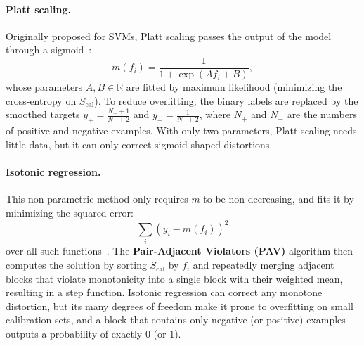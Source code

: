 \documentclass[a4paper, 10pt]{article}
\begin{document}
\paragraph{Platt scaling.}
Originally proposed for SVMs, Platt scaling passes the output of the model through a sigmoid~\cite{niculescu2005predicting}:
\begin{equation}\label{eq:platt}
    m(f_i) = \frac{1}{1 + \exp(A f_i + B)},
\end{equation}
whose parameters $A, B \in \mathbb{R}$ are fitted by maximum likelihood (minimizing the cross-entropy on $S_{\mathrm{cal}}$). To reduce overfitting, the binary labels are replaced by the smoothed targets $y_+ = \frac{N_+ + 1}{N_+ + 2}$ and $y_- = \frac{1}{N_- + 2}$, where $N_+$ and $N_-$ are the numbers of positive and negative examples. With only two parameters, Platt scaling needs little data, but it can only correct sigmoid-shaped distortions.
 
\paragraph{Isotonic regression.}
This non-parametric method only requires $m$ to be non-decreasing, and fits it by minimizing the squared error:
\begin{equation}
  \sum_i (y_i - m(f_i))^2
\end{equation}
over all such functions~\cite{niculescu2005predicting}. The \textbf{Pair-Adjacent Violators (PAV)} algorithm then computes the solution by sorting $S_{\mathrm{cal}}$ by $f_i$ and repeatedly merging adjacent blocks that violate monotonicity into a single block with their weighted mean, resulting in a step function. Isotonic regression can correct any monotone distortion, but its many degrees of freedom make it prone to overfitting on small calibration sets, and a block that contains only negative (or positive) examples outputs a probability of exactly $0$ (or $1$).
\end{document}
